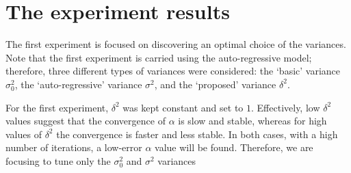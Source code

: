 \documentclass[12pt]{article}
\begin{document}
\section*{The experiment results}

\par The first experiment is focused on discovering an optimal choice of the variances. Note that the first experiment is carried using the auto-regressive model; therefore, three different types of variances were considered: the `basic' variance $\sigma^2_0$, the `auto-regressive' variance $\sigma^2$, and the `proposed' variance $\delta^2$. 

\par For the first experiment, $\delta^2$ was kept constant and set to $1$. Effectively, low $\delta^2$ values suggest that the convergence of $\alpha$ is slow and stable, whereas for high values of $\delta^2$ the convergence is faster and less stable. In both cases, with a high number of iterations, a low-error $\alpha$ value will be found. Therefore, we are focusing to tune only the $\sigma^2_0$ and $\sigma^2$ variances

\end{document}
